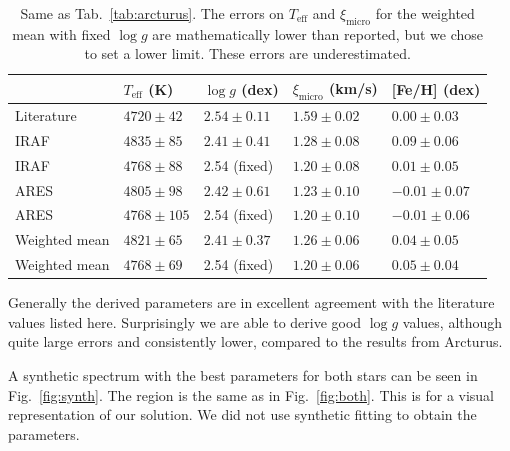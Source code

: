 \documentclass{aa}
\begin{document}
\begin{table}[htb!]
    \caption{Same as Tab.~\ref{tab:arcturus}. The errors on $T_\mathrm{eff}$ and
             $\xi_\mathrm{micro}$ for the weighted mean with fixed $\log g$ are
             mathematically lower than reported, but we chose to set a lower
             limit. These errors are underestimated.}
    \label{tab:10Leo}
    \centering
    \begin{tabular}{lllll}
      \hline\hline
                     & $T_\mathrm{eff}$ (K) &  $\log g$ (dex)  &   $\xi_\mathrm{micro}$ (km/s)   & [Fe/H] (dex)     \\
      \hline
        Literature   & $4720 \pm  42$       &  $2.54 \pm 0.11$ &    $1.59 \pm 0.02$              & $ 0.00 \pm 0.03$ \\
      \hline
        IRAF         & $4835 \pm  85$       &  $2.41 \pm 0.41$ &    $1.28 \pm 0.08$              & $ 0.09 \pm 0.06$ \\
        IRAF         & $4768 \pm  88$       &   2.54 (fixed)   &    $1.20 \pm 0.08$              & $ 0.01 \pm 0.05$ \\
      \hline
        ARES         & $4805 \pm  98$       &  $2.42 \pm 0.61$ &    $1.23 \pm 0.10$              & $-0.01 \pm 0.07$ \\
        ARES         & $4768 \pm 105$       &   2.54 (fixed)   &    $1.20 \pm 0.10$              & $-0.01 \pm 0.06$ \\
      \hline
        Weighted mean& $4821 \pm  65$       &  $2.41 \pm 0.37$ &    $1.26 \pm 0.06$              & $ 0.04 \pm 0.05$ \\
        Weighted mean& $4768 \pm  69$       &   2.54 (fixed)   &    $1.20 \pm 0.06$              & $ 0.05 \pm 0.04$ \\
      \hline
    \end{tabular}
\end{table}

Generally the derived parameters are in excellent agreement with the literature
values listed here. Surprisingly we are able to derive good $\log g$ values,
although quite large errors and consistently lower, compared to the results from
Arcturus.

A synthetic spectrum with the best parameters for both stars can be seen in
Fig.~\ref{fig:synth}. The region is the same as in Fig.~\ref{fig:both}. This is
for a visual representation of our solution. We did not use synthetic fitting
to obtain the parameters.
\end{document}

